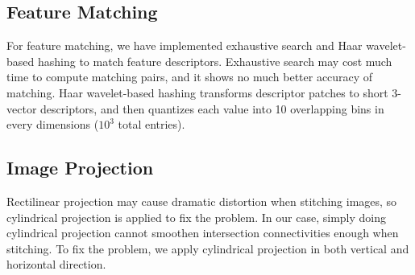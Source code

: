 \documentclass[11pt]{article}
\begin{document}
\subsection{Feature Matching}
For feature matching, we have implemented exhaustive search and  Haar wavelet-based hashing to match feature descriptors. Exhaustive search may cost much time to compute matching pairs, and it shows no much better accuracy of matching. Haar wavelet-based hashing transforms descriptor patches to short 3-vector descriptors, and then quantizes each value into 10 overlapping bins in every dimensions ($10^3$ total entries).

\subsection{Image Projection}
Rectilinear projection may cause dramatic distortion when stitching images, so cylindrical projection is applied to fix the problem. In our case, simply doing cylindrical projection cannot smoothen intersection connectivities enough when stitching. To fix the problem, we apply cylindrical projection in both vertical and horizontal direction.
\end{document}
